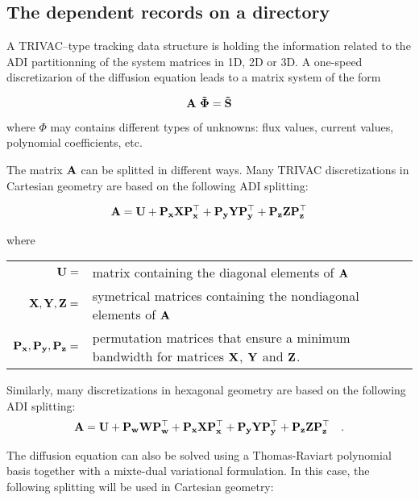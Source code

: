 \subsection{The  dependent records on a
 directory}\label{sect:trivatrackingdir}

A TRIVAC--type tracking data structure is holding the information related to
the ADI partitionning of the system matrices in 1D, 2D or 3D. A one-speed
discretizarion of the diffusion equation leads to a matrix system of the form

\begin{equation}
\bf{A} \ \vec\Phi = \vec S
\label{eq:tratr1}
\end{equation}

\noindent where $\Phi$ may contains different types of unknowns: flux values,
current values, polynomial coefficients, etc.

\vskip 0.2cm

The matrix $\bf{A}$ can be splitted in different ways. Many TRIVAC discretizations in
Cartesian geometry are based on the following ADI splitting:

\begin{equation}
\bf{A} = \bf{U} + \bf{P}_x\bf{X}\bf{P}_x^\top + \bf{P}_y\bf{Y}\bf{P}_y^\top + \bf{P}_z\bf{Z}\bf{P}_z^\top
\label{eq:tratr2}
\end{equation}

\noindent where

\begin{tabular}{rl}
$\bf{U}=$ & matrix containing the diagonal elements of $\bf{A}$\\
$\bf{X},\bf{Y},\bf{Z}=$ & symetrical matrices containing the nondiagonal elements of $\bf{A}$\\
$\bf{P}_x,\bf{P}_y,\bf{P}_z=$ & permutation matrices that ensure a minimum bandwidth for matrices $\bf{X}$, $\bf{Y}$ and $\bf{Z}$.\\
\end{tabular}

\vskip 0.2cm

Similarly, many discretizations in hexagonal geometry are based on the following ADI splitting:
\begin{equation}
\bf{A} = \bf{U} + \bf{P_w}\bf{W}\bf{P}_w^\top + \bf{P}_x\bf{X}\bf{P}_x^\top + \bf{P}_y\bf{Y}\bf{P}_y^\top + \bf{P}_z\bf{Z}\bf{P}_z^\top \ \ \ .
\label{eq:tratr3}
\end{equation}

The diffusion equation can also be solved using a Thomas-Raviart polynomial basis together with a mixte-dual
variational formulation. In this case, the following splitting will be used in Cartesian geometry:


